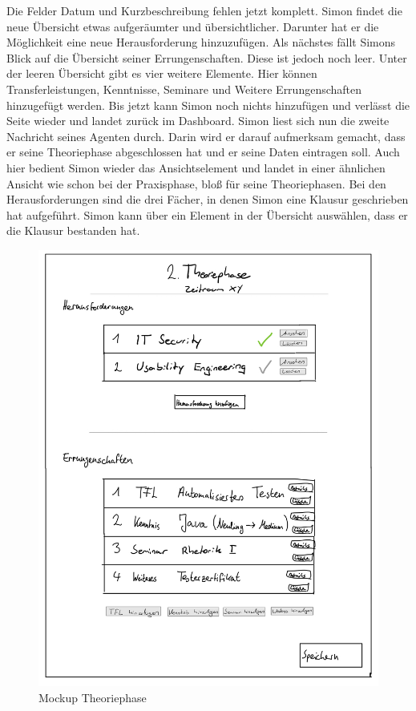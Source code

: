 \documentclass[
  12pt,
  ngerman,
  a4paper,
]{article}
\begin{document}
Die Felder Datum und Kurzbeschreibung fehlen jetzt komplett. Simon
findet die neue Übersicht etwas aufgeräumter und übersichtlicher.
Darunter hat er die Möglichkeit eine neue Herausforderung hinzuzufügen.
Als nächstes fällt Simons Blick auf die Übersicht seiner
Errungenschaften. Diese ist jedoch noch leer. Unter der leeren Übersicht
gibt es vier weitere Elemente. Hier können Transferleistungen,
Kenntnisse, Seminare und Weitere Errungenschaften hinzugefügt werden.
Bis jetzt kann Simon noch nichts hinzufügen und verlässt die Seite
wieder und landet zurück im Dashboard. Simon liest sich nun die zweite
Nachricht seines Agenten durch. Darin wird er darauf aufmerksam gemacht,
dass er seine Theoriephase abgeschlossen hat und er seine Daten
eintragen soll. Auch hier bedient Simon wieder das Ansichtselement und
landet in einer ähnlichen Ansicht wie schon bei der Praxisphase, bloß
für seine Theoriephasen. Bei den Herausforderungen sind die drei Fächer,
in denen Simon eine Klausur geschrieben hat aufgeführt. Simon kann über
ein Element in der Übersicht auswählen, dass er die Klausur bestanden
hat.

\begin{figure}
\centering
\includegraphics{./tex2pdf.-930e6666e1221838/e68f24401b51bf56e86e190871524182e3c53297.jpg}
\caption{Mockup Theoriephase}
\end{figure}
\end{document}
